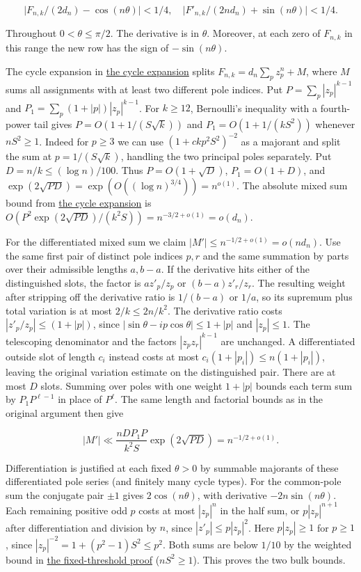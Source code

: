 \documentclass[11pt]{article}
\begin{document}
\[
 \big|F_{n,k}/(2d_n)-\cos(n\theta)\big|<1/4,\quad
 \big|F'_{n,k}/(2n d_n)+\sin(n\theta)\big|<1/4.
\]

Throughout $0<\theta\le\pi/2$. The derivative is in $\theta$. Moreover, at each zero of $F_{n,k}$ in this range the new row has the sign of $-\sin(n\theta)$.

The cycle expansion in \href{https://github.com/ProgramComputer/open-math-research/blob/main/topics/long-cycle-excedances/linear-cutoffs.md}{the cycle expansion} splits $F_{n,k}=d_n\sum_p z_p^n+M$, where $M$ sums all assignments with at least two different pole indices. Put $P=\sum_p|z_p|^{k-1}$ and $P_1=\sum_p(1+|p|)|z_p|^{k-1}$. For $k\ge12$, Bernoulli's inequality with a fourth-power tail gives $P=O(1+1/(S\sqrt k))$ and $P_1=O(1+1/(k S^2))$ whenever $nS^2\ge1$. Indeed for $p\ge3$ we can use $(1+c k p^2 S^2)^{-2}$ as a majorant and split the sum at $p=1/(S\sqrt k)$, handling the two principal poles separately. Put $D=n/k\le(\log n)/100$. Thus $P=O(1+\sqrt D)$, $P_1=O(1+D)$, and $\exp(2\sqrt{PD})=\exp(O((\log n)^{3/4}))=n^{o(1)}$. The absolute mixed sum bound from \href{https://github.com/ProgramComputer/open-math-research/blob/main/topics/long-cycle-excedances/linear-cutoffs.md}{the cycle expansion} is $O(P^2\exp(2\sqrt{PD})/(k^2 S))=n^{-3/2+o(1)}=o(d_n)$.

For the differentiated mixed sum we claim $|M'|\le n^{-1/2+o(1)}=o(n d_n)$. Use the same first pair of distinct pole indices $p,r$ and the same summation by parts over their admissible lengths $a,b-a$. If the derivative hits either of the distinguished slots, the factor is $a z'_p/z_p$ or $(b-a)z'_r/z_r$. The resulting weight after stripping off the derivative ratio is $1/(b-a)$ or $1/a$, so its supremum plus total variation is at most $2/k\le2n/k^2$. The derivative ratio costs $|z'_p/z_p|\le(1+|p|)$, since $|\sin\theta-ip\cos\theta|\le1+|p|$ and $|z_p|\le1$. The telescoping denominator and the factors $|z_p z_r|^{k-1}$ are unchanged. A differentiated outside slot of length $c_i$ instead costs at most $c_i(1+|p_i|)\le n(1+|p_i|)$, leaving the original variation estimate on the distinguished pair. There are at most $D$ slots. Summing over poles with one weight $1+|p|$ bounds each term sum by $P_1 P^{\ell-1}$ in place of $P^\ell$. The same length and factorial bounds as in the original argument then give

\[
 |M'|\ll\frac{n D P_1 P}{k^2 S}\exp(2\sqrt{PD})=n^{-1/2+o(1)}.
\]

Differentiation is justified at each fixed $\theta>0$ by summable majorants of these differentiated pole series (and finitely many cycle types). For the common-pole sum the conjugate pair $\pm1$ gives $2\cos(n\theta)$, with derivative $-2n\sin(n\theta)$. Each remaining positive odd $p$ costs at most $|z_p|^n$ in the half sum, or $p|z_p|^{n+1}$ after differentiation and division by $n$, since $|z'_p|\le p|z_p|^2$. Here $p|z_p|\ge1$ for $p\ge1$, since $|z_p|^{-2}=1+(p^2-1)S^2\le p^2$. Both sums are below $1/10$ by the weighted bound in \href{https://github.com/ProgramComputer/open-math-research/blob/main/topics/long-cycle-excedances/fixed-threshold.md}{the fixed-threshold proof} ($nS^2\ge1$). This proves the two bulk bounds.
\end{document}
